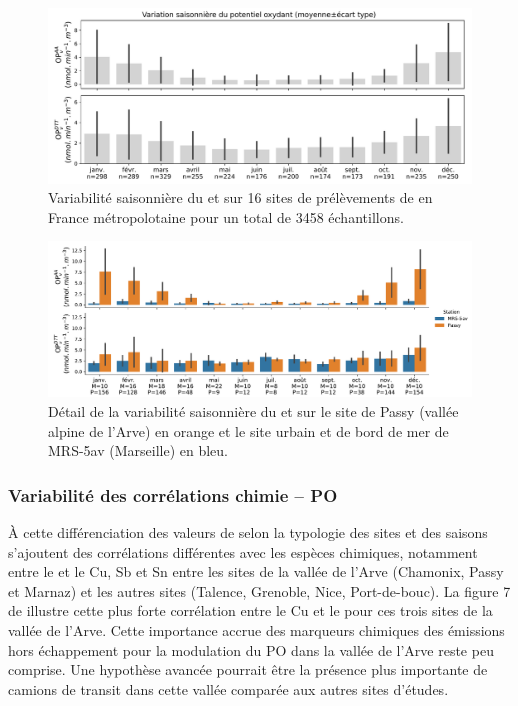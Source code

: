 \begin{figure}[ht]
    \centering
    \includegraphics[width=1.0\linewidth]{figures/chapter04/variabilite_saisonniere.pdf}
    \caption{Variabilité saisonnière du \POAAv{} et \PODTTv{} sur 16 sites de prélèvements
        de \PMdix{} en France métropolotaine pour un total de 3458 échantillons.
    }%
    \label{fig:variabilite_saisonniere}
\end{figure}


\begin{figure}[ht]
    \centering
    \includegraphics[width=1.0\linewidth]{figures/chapter04/variabilite_saisonniere_MRS-Passy.pdf}
    \caption{Détail de la variabilité saisonnière du \POAAv{} et \PODTTv{} sur le site de
        Passy (vallée alpine de l'Arve) en orange et le site urbain et de bord de mer de MRS-5av
        (Marseille) en bleu.
    }%
    \label{fig:variabilite_saisonniere_MRS_PASSY}
\end{figure}

\subsubsection{Variabilité des corrélations chimie -- PO}%
\label{ssub:_variabilité_des_corrélations_chimie_po}

À cette différenciation des valeurs de \POv{} selon la typologie des sites et des saisons s'ajoutent des
corrélations différentes avec les espèces chimiques, notamment entre le \POAAv{} et le
Cu, Sb et Sn entre les sites de la vallée de l'Arve (Chamonix, Passy et Marnaz) et les
autres sites (Talence, Grenoble, Nice, Port-de-bouc). La figure 7 de
\cite{calasSeasonal2019} illustre cette plus forte corrélation entre le Cu et le \POAAv{}
pour ces trois sites de la vallée de l'Arve. Cette importance accrue des marqueurs chimiques des
émissions hors échappement pour la modulation du PO dans la vallée de l'Arve reste peu
comprise. Une hypothèse avancée pourrait être la présence plus importante de camions de
transit dans cette vallée comparée aux autres sites d'études.

